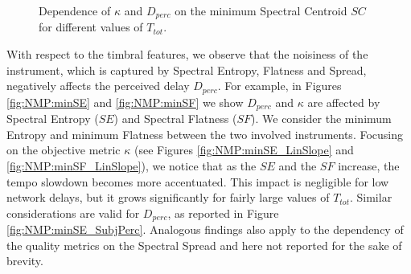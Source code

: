 \begin{figure}[!tb]
\begin{flushright}
    \hfil
\end{flushright}
\caption{Dependence of $\kappa$ and $D_{perc}$ on the minimum Spectral Centroid $SC$ for different values of $T_{tot}$.}
\label{fig:NMP:minSC}
\end{figure}


With respect to the timbral features, we observe that the noisiness of the instrument, which is captured by Spectral Entropy, Flatness and Spread, negatively affects the perceived delay $D_{perc}$. For example, in Figures \ref{fig:NMP:minSE} and \ref{fig:NMP:minSF} we show $D_{perc}$ and $\kappa$ are affected by Spectral Entropy ($SE$) and Spectral Flatness ($SF$). We consider the minimum Entropy and minimum Flatness between the two involved instruments. Focusing on the objective metric $\kappa$ (see Figures \ref{fig:NMP:minSE_LinSlope} and \ref{fig:NMP:minSF_LinSlope}), we notice that as the $SE$ and the $SF$ increase, the tempo  slowdown becomes more accentuated. This impact is negligible for low network delays, but it grows significantly for fairly large values of $T_{tot}$. Similar considerations are valid for $D_{perc}$, as reported in Figure \ref{fig:NMP:minSE_SubjPerc}. Analogous findings also apply to the dependency of the quality metrics on the Spectral Spread and here not reported for the sake of brevity.  

